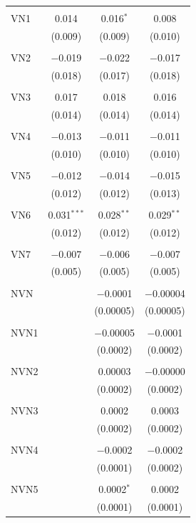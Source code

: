 \begin{table}[!htbp]
\begin{tabular}{@{\extracolsep{5pt}}lccc}
  & & & \\ 
 VN1 & 0.014 & 0.016$^{*}$ & 0.008 \\ 
  & (0.009) & (0.009) & (0.010) \\ 
  & & & \\ 
 VN2 & $-$0.019 & $-$0.022 & $-$0.017 \\ 
  & (0.018) & (0.017) & (0.018) \\ 
  & & & \\ 
 VN3 & 0.017 & 0.018 & 0.016 \\ 
  & (0.014) & (0.014) & (0.014) \\ 
  & & & \\ 
 VN4 & $-$0.013 & $-$0.011 & $-$0.011 \\ 
  & (0.010) & (0.010) & (0.010) \\ 
  & & & \\ 
 VN5 & $-$0.012 & $-$0.014 & $-$0.015 \\ 
  & (0.012) & (0.012) & (0.013) \\ 
  & & & \\ 
 VN6 & 0.031$^{***}$ & 0.028$^{**}$ & 0.029$^{**}$ \\ 
  & (0.012) & (0.012) & (0.012) \\ 
  & & & \\ 
 VN7 & $-$0.007 & $-$0.006 & $-$0.007 \\ 
  & (0.005) & (0.005) & (0.005) \\ 
  & & & \\ 
 NVN &  & $-$0.0001 & $-$0.00004 \\ 
  &  & (0.00005) & (0.00005) \\ 
  & & & \\ 
 NVN1 &  & $-$0.00005 & $-$0.0001 \\ 
  &  & (0.0002) & (0.0002) \\ 
  & & & \\ 
 NVN2 &  & 0.00003 & $-$0.00000 \\ 
  &  & (0.0002) & (0.0002) \\ 
  & & & \\ 
 NVN3 &  & 0.0002 & 0.0003 \\ 
  &  & (0.0002) & (0.0002) \\ 
  & & & \\ 
 NVN4 &  & $-$0.0002 & $-$0.0002 \\ 
  &  & (0.0001) & (0.0002) \\ 
  & & & \\ 
 NVN5 &  & 0.0002$^{*}$ & 0.0002 \\ 
  &  & (0.0001) & (0.0001) \\ 

\end{tabular}
\end{table}
